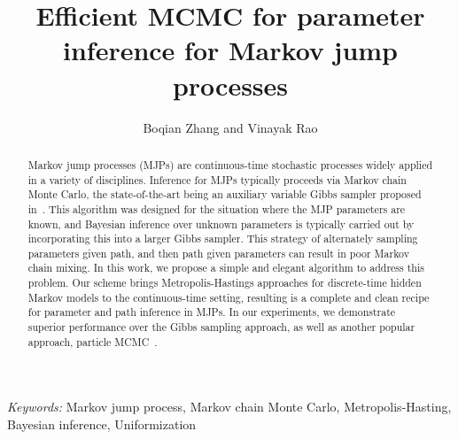 \documentclass{statsoc}
\title[Efficient MCMC for parameter inference for MJPs]{\bf Efficient MCMC for parameter inference for Markov jump processes}
\author{Boqian Zhang and Vinayak Rao}
\begin{document}
\def\spacingset#1{\renewcommand{\baselinestretch}
{#1}\small\normalsize} \spacingset{1}



\begin{abstract}
Markov jump processes (MJPs) are continuous-time stochastic processes 
widely applied in a variety of disciplines. Inference for MJPs typically
proceeds via Markov chain Monte Carlo, the state-of-the-art being an auxiliary
variable Gibbs sampler proposed in~\cite{RaoTeh13}. This algorithm was
designed for the situation where the MJP parameters are known, and Bayesian
inference over unknown parameters is typically carried out by incorporating
this into a larger Gibbs sampler.
This strategy of alternately sampling parameters given path, and
then path given parameters can result in poor Markov chain mixing. In this
work, we propose a simple and elegant algorithm to address this
problem. Our scheme brings Metropolis-Hastings approaches
for discrete-time hidden Markov models to the continuous-time
setting, %
resulting is a complete and clean recipe for
parameter and path inference in MJPs. In our experiments, we
demonstrate superior performance over the Gibbs sampling approach, as well as
another popular approach, particle MCMC~\cite{Andrieu10}.
\end{abstract}
\noindent%
{\it Keywords:}  Markov jump process, Markov chain Monte Carlo, Metropolis-Hasting, Bayesian
inference, Uniformization
\vspace{-.05in}






%







%
\end{document}
